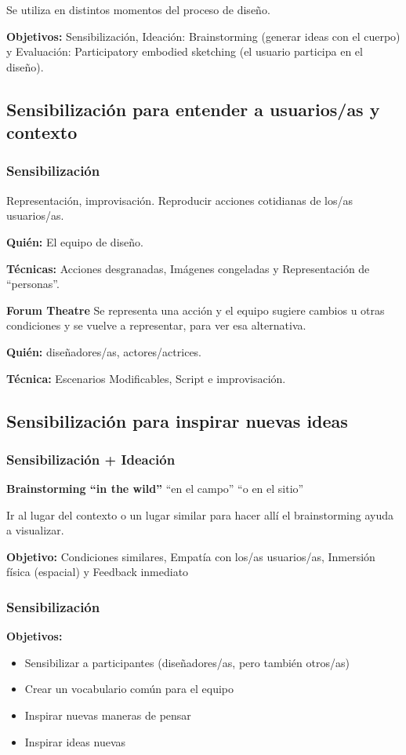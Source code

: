 \documentclass[12pt]{report} %
\begin{document}
Se utiliza en distintos momentos del proceso de diseño.

\textbf{Objetivos:} Sensibilización, Ideación: Brainstorming (generar ideas con el cuerpo) y Evaluación: Participatory embodied sketching (el usuario participa en el diseño).

\subsection{Sensibilización para entender a usuarios/as y contexto}
\subsubsection{Sensibilización}
Representación, improvisación. Reproducir acciones cotidianas de los/as usuarios/as.

\textbf{Quién:} El equipo de diseño.

\textbf{Técnicas:} Acciones desgranadas, Imágenes congeladas y Representación de “personas”.


\textbf{Forum Theatre}
Se representa una acción y el equipo sugiere cambios u otras condiciones y se vuelve a representar, para ver esa alternativa.

\textbf{Quién:} diseñadores/as, actores/actrices.

\textbf{Técnica:} Escenarios Modificables, Script e improvisación.

\subsection{Sensibilización para inspirar nuevas ideas}
\subsubsection{Sensibilización + Ideación}
\textbf{Brainstorming “in the wild”} “en el campo” “o en el sitio”

Ir al lugar del contexto o un lugar similar para hacer allí el brainstorming ayuda a visualizar.

\textbf{Objetivo:} Condiciones similares, Empatía con los/as usuarios/as, Inmersión física (espacial) y Feedback inmediato

\subsubsection{Sensibilización}
\textbf{Objetivos:}
\begin{itemize}
  \item Sensibilizar a participantes (diseñadores/as, pero también otros/as)
  \item Crear un vocabulario común para el equipo
  \item Inspirar nuevas maneras de pensar
  \item Inspirar ideas nuevas
\end{itemize}
\end{document}
